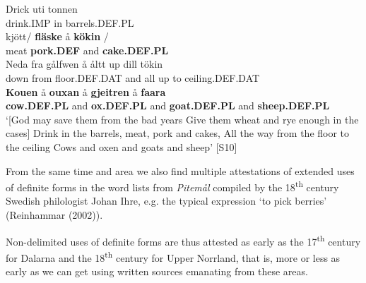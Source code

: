 \ea\label{}
\gll Drick  uti  tonnen\\


drink.IMP  in  barrels.DEF.PL\\ %


\ea\label{}
\gll kjött/  \textbf{fläske}  å  \textbf{kökin}  /\\


meat  \textbf{pork.DEF} and  \textbf{cake.DEF.PL} \\ %


\ea\label{}
\gll Neda  fra  gålfwen  å  åltt  up  dill  tökin\\


down  from  floor.DEF.DAT  and  all  up  to  ceiling.DEF.DAT\\ %


\ea\label{}
\gll \textbf{Kouen} å  \textbf{ouxan} å  \textbf{gjeitren} å  \textbf{faara} \\


\textbf{cow.DEF.PL} and  \textbf{ox.DEF.PL} and  \textbf{goat.DEF.PL} and  \textbf{sheep.DEF.PL} \\ %


‘[God may save them from the bad years\newline
Give them wheat and rye enough in the cases]\newline
Drink in the barrels, meat, pork and cakes,\newline
All the way from the floor to the ceiling\newline
Cows and oxen and goats and sheep’ [S10]
\z


From the same time and area we also find multiple attestations of extended uses of definite forms in the word lists from \textit{Pitemål} compiled by the 18\textsuperscript{th} century Swedish philologist Johan Ihre, e.g. the typical expression ‘to pick berries’ (Reinhammar (2002)).

Non-delimited uses of definite forms are thus attested as early as the 17\textsuperscript{th} century for Dalarna and the 18\textsuperscript{th} century for Upper Norrland, that is, more or less as early as we can get using written sources emanating from these areas. 


